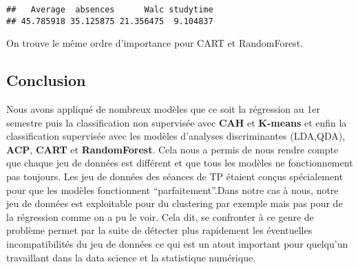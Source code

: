 \documentclass[
]{article}
\begin{document}
\begin{verbatim}
##   Average  absences      Walc studytime 
## 45.785918 35.125875 21.356475  9.104837
\end{verbatim}

On trouve le même ordre d'importance pour CART et RandomForest.

\hypertarget{conclusion}{%
\subsection{Conclusion}\label{conclusion}}

Nous avons appliqué de nombreux modèles que ce soit la régression au 1er
semestre puis la classification non supervisée avec \textbf{CAH} et
\textbf{K-means} et enfin la classification supervisée avec les modèles
d'analyses discriminantes (LDA,QDA), \textbf{ACP}, \textbf{CART} et
\textbf{RandomForest}. Cela nous a permis de nous rendre compte que
chaque jeu de données est différent et que tous les modèles ne
fonctionnement pas toujours. Les jeu de données des séances de TP
étaient conçus spécialement pour que les modèles fonctionnent
``parfaitement''.Dans notre cas à nous, notre jeu de données est
exploitable pour du clustering par exemple mais pas pour de la
régression comme on a pu le voir. Cela dit, se confronter à ce genre de
problème permet par la suite de détecter plus rapidement les éventuelles
incompatibilités du jeu de données ce qui est un atout important pour
quelqu'un travaillant dans la data science et la statistique numérique.
\end{document}
